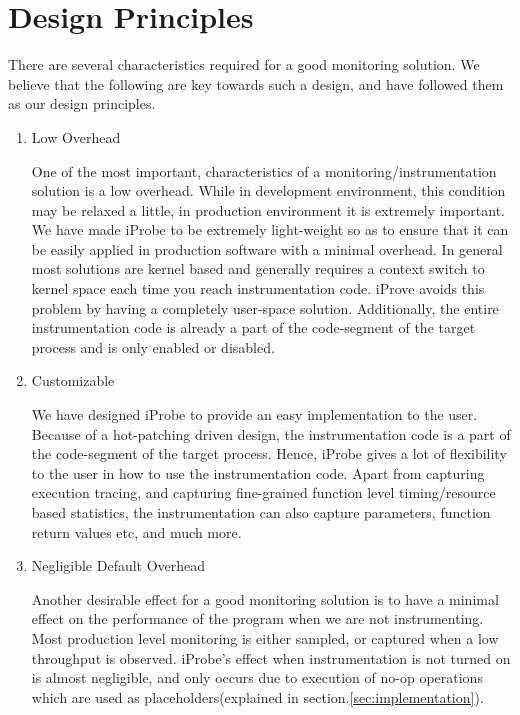 
  
\section{Design Principles}
\label{sec:design}


There are several characteristics required for a good monitoring solution. We believe that the following are key towards such a design, and have followed them as our design principles.

\begin{enumerate}
  
  \item {Low Overhead}
  
  One of the most important, characteristics of a monitoring/instrumentation solution is a low overhead. While in development environment, this condition may be relaxed a little, in production environment it is extremely important. We have made iProbe to be extremely light-weight so as to ensure that it can be easily applied in production software with a minimal overhead. In general most solutions are kernel based and generally requires a context switch to kernel space each time you reach instrumentation code. iProve avoids this problem by having a completely user-space solution. Additionally, the entire instrumentation code is already a part of the code-segment of the target process and is only enabled or disabled.

  \item {Customizable}
  
  We have designed iProbe to provide an easy implementation to the user. Because of a hot-patching driven design, the instrumentation code is a part of the code-segment of the target process. Hence, iProbe gives a lot of flexibility to the user in how to use the instrumentation code. Apart from capturing execution tracing, and capturing fine-grained function level timing/resource based statistics, the instrumentation can also capture parameters, function return values etc, and much more.
  
  \item {Negligible Default Overhead} 
  
  Another desirable effect for a good monitoring solution is to have a minimal effect on the performance of the program when we are not instrumenting. Most production level monitoring is either sampled, or captured when a low throughput is observed. iProbe's effect when instrumentation is not turned on is almost negligible, and only occurs due to execution of no-op operations which are used as placeholders(explained in section.\ref{sec:implementation}).
  

\end{enumerate}
